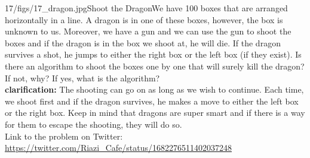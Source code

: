 \begin{problem}{17/figs/17_dragon.jpg}{Shoot the Dragon}We have 100 boxes that are arranged horizontally in a line. A dragon is in one of these boxes, however, the box is unknown to us. Moreover, we have a gun and we can use the gun to shoot the boxes and if the dragon is in the box we shoot at, he will die. If the dragon survives a shot, he jumps to either the right box or the left box (if they exist). Is there an algorithm to shoot the boxes one by one that will surely kill the dragon? If not, why? If yes, what is the algorithm?\\[0.2cm]

\textbf{clarification:} The shooting can go on as long as we wish to continue. Each time, we shoot first and if the dragon survives, he makes a move to either the left box or the right box. Keep in mind that dragons are super smart and if there is a way for them to escape the shooting, they will do so.\\[0.2cm]

 Link to the problem on Twitter: \url{https://twitter.com/Riazi_Cafe/status/1682276511402037248}\end{problem}